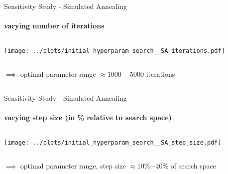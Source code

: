 \documentclass[11pt,aspectratio=169]{beamer}
\begin{document}
\begin{frame}{Sensitivity Study - Simulated Annealing}
    \framesubtitle{varying \textbf{number of iterations}}

    \begin{columns}
    \begin{column}{0.8\textwidth}
        \texttt{[image: ../plots/initial\_hyperparam\_search\_\_SA\_iterations.pdf]}
    \end{column}
    \end{columns}

    \begin{columns}
        \begin{column}{0.8\textwidth}
            $\implies$ optimal parameter range $\approx 1000-5000$ iterations
        \end{column}
        \begin{column}{0.1\textwidth}
            \tiny{}
        \end{column}
    \end{columns}

\end{frame}

%
%

\begin{frame}{Sensitivity Study - Simulated Annealing}
    \framesubtitle{varying \textbf{step size} (in \% relative to search space)}

    \begin{columns}
    \begin{column}{0.8\textwidth}
        \texttt{[image: ../plots/initial\_hyperparam\_search\_\_SA\_step\_size.pdf]}
    \end{column}
    \end{columns}

    \begin{columns}
        \begin{column}{0.8\textwidth}
            $\implies$ optimal parameter range, step size $\approx 10$\%$-40$\% of search space
        \end{column}
        \begin{column}{0.1\textwidth}
            \tiny{}
        \end{column}
    \end{columns}

\end{frame}
\end{document}
